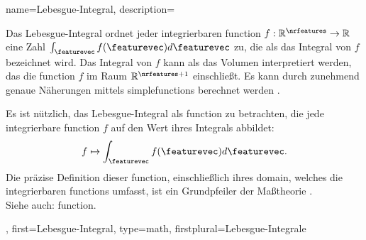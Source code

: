 {{
{name={Lebesgue-Integral},
	description={Das Lebesgue-Integral ordnet jeder integrierbaren \gls{function} 
	$f: \mathbb{R}^{\nrfeatures} \rightarrow \mathbb{R}$ eine Zahl 
	$\int_{\featurevec} f(\featurevec) d\featurevec$ zu, die als das Integral von $f$ bezeichnet wird. 
	Das Integral von $f$ kann als das Volumen interpretiert werden, das die \gls{function} 
	$f$ im Raum $\mathbb{R}^{\nrfeatures+1}$ einschließt. Es kann durch zunehmend genaue 
	Näherungen mittels \glspl{simplefunction} berechnet werden \cite[Ch. 1]{RudinBook}. 
	\begin{figure}[H]
		\centering
{}
\end{figure}
Es ist nützlich, das Lebesgue-Integral als \gls{function} zu betrachten, die jede integrierbare 
\gls{function} $f$ auf den Wert ihres Integrals abbildet:
$$ f \mapsto \int_{\featurevec} f(\featurevec) d\featurevec.$$ 
Die präzise Definition dieser \gls{function}, einschließlich ihres \gls{domain}, 
welches die integrierbaren \glspl{function} umfasst, ist ein Grundpfeiler der 
Maßtheorie \cite[Ch. 1]{RudinBook}.
					\\ 
		Siehe auch: \gls{function}.},
	first={Lebesgue-Integral},
	type=math, 
	firstplural={Lebesgue-Integrale}
}

}}
